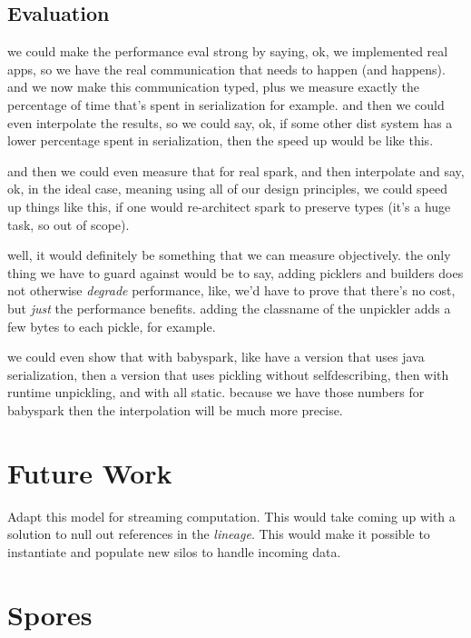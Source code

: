 \documentclass[preprint]{sigplanconf}
\theoremstyle{definition}
\theoremstyle{definition}
\begin{document}
\subsection{Evaluation}

we could make the performance eval strong by saying, ok, we implemented real
apps, so we have the real communication that needs to happen (and happens).
and we now make this communication typed, plus we measure exactly the
percentage of time that's spent in serialization for example. and then we
could even interpolate the results, so we could say, ok, if some other dist
system has a lower percentage spent in serialization, then the speed up would
be like this.

and then we could even measure that for real spark, and then interpolate and
say, ok, in the ideal case, meaning using all of our design principles, we
could speed up things like this, if one would re-architect spark to preserve
types (it's a huge task, so out of scope).

well, it would definitely be something that we can measure objectively. the
only thing we have to guard against would be to say, adding picklers and
builders does not otherwise \emph{degrade} performance, like, we'd have to
prove that there's no cost, but \emph{just} the performance benefits. adding
the classname of the unpickler adds a few bytes to each pickle, for example.

we could even show that with babyspark, like have a version that uses java
serialization, then a version that uses pickling without selfdescribing, then
with runtime unpickling, and with all static. because we have those numbers
for babyspark then the interpolation will be much more precise.



\section{Future Work}

Adapt this model for streaming computation. This would take coming up with a
solution to null out references in the {\em lineage}. This would make it possible to instantiate and populate new silos to handle incoming data.

\appendix
\section{Spores}
\label{appendix:spores}

\end{document}
